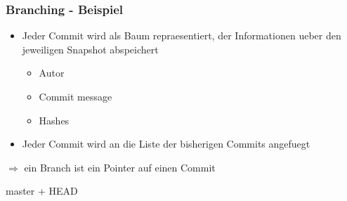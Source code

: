 \documentclass[12pt,utf8]{beamer}
\begin{document}
	\begin{frame}
		\frametitle{Branching - Beispiel}
		\begin{itemize}
			\item Jeder Commit wird als Baum repraesentiert, der Informationen ueber den jeweiligen Snapshot abspeichert
			\begin{itemize}
				\item Autor
				\item Commit message
				\item Hashes
			\end{itemize}
			\item Jeder Commit wird an die Liste der bisherigen Commits angefuegt
		\end{itemize}
		$\Rightarrow$ ein Branch ist ein Pointer auf einen Commit
	\end{frame}

	\begin{frame}
		master + HEAD
	\end{frame}
	
	\begin{frame}
		
		\tiny
	\end{frame}
	
\end{document}
